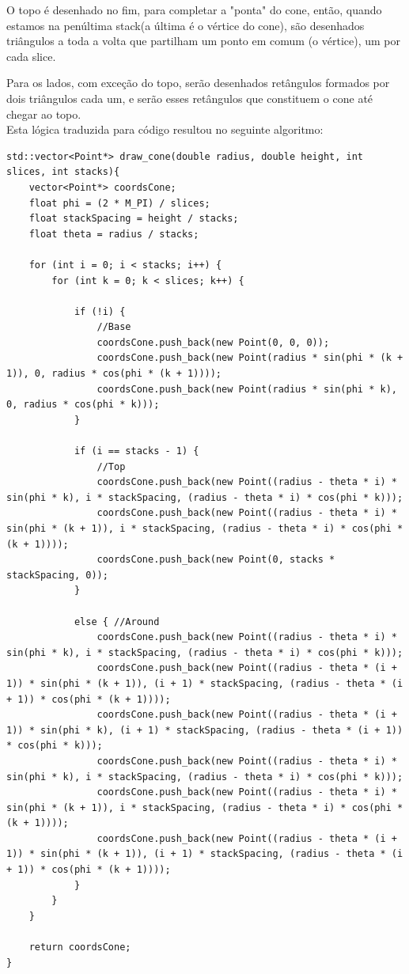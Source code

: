 \documentclass[a4paper]{article}
\begin{document}
O topo é desenhado no fim, para completar a "ponta" do cone, então, quando estamos na penúltima stack(a última é o vértice do cone), são desenhados triângulos a toda a volta que partilham um ponto em comum (o vértice), um por cada slice.

Para os lados, com exceção do topo, serão desenhados retângulos formados por dois triângulos cada um, e serão esses retângulos que constituem o cone até chegar ao topo.
\\
Esta lógica traduzida para código resultou no seguinte algoritmo:
\\
\begin{lstlisting}
std::vector<Point*> draw_cone(double radius, double height, int slices, int stacks){
    vector<Point*> coordsCone;
    float phi = (2 * M_PI) / slices;
    float stackSpacing = height / stacks;
    float theta = radius / stacks;

    for (int i = 0; i < stacks; i++) {
        for (int k = 0; k < slices; k++) {

            if (!i) {
                //Base
                coordsCone.push_back(new Point(0, 0, 0));
                coordsCone.push_back(new Point(radius * sin(phi * (k + 1)), 0, radius * cos(phi * (k + 1))));
                coordsCone.push_back(new Point(radius * sin(phi * k), 0, radius * cos(phi * k)));
            }

            if (i == stacks - 1) {
                //Top
                coordsCone.push_back(new Point((radius - theta * i) * sin(phi * k), i * stackSpacing, (radius - theta * i) * cos(phi * k)));
                coordsCone.push_back(new Point((radius - theta * i) * sin(phi * (k + 1)), i * stackSpacing, (radius - theta * i) * cos(phi * (k + 1))));
                coordsCone.push_back(new Point(0, stacks * stackSpacing, 0));
            }

            else { //Around
                coordsCone.push_back(new Point((radius - theta * i) * sin(phi * k), i * stackSpacing, (radius - theta * i) * cos(phi * k)));
                coordsCone.push_back(new Point((radius - theta * (i + 1)) * sin(phi * (k + 1)), (i + 1) * stackSpacing, (radius - theta * (i + 1)) * cos(phi * (k + 1))));
                coordsCone.push_back(new Point((radius - theta * (i + 1)) * sin(phi * k), (i + 1) * stackSpacing, (radius - theta * (i + 1)) * cos(phi * k)));
                coordsCone.push_back(new Point((radius - theta * i) * sin(phi * k), i * stackSpacing, (radius - theta * i) * cos(phi * k)));
                coordsCone.push_back(new Point((radius - theta * i) * sin(phi * (k + 1)), i * stackSpacing, (radius - theta * i) * cos(phi * (k + 1))));
                coordsCone.push_back(new Point((radius - theta * (i + 1)) * sin(phi * (k + 1)), (i + 1) * stackSpacing, (radius - theta * (i + 1)) * cos(phi * (k + 1))));
            }
        }
    }

    return coordsCone;
}

\end{lstlisting}
\end{document}
